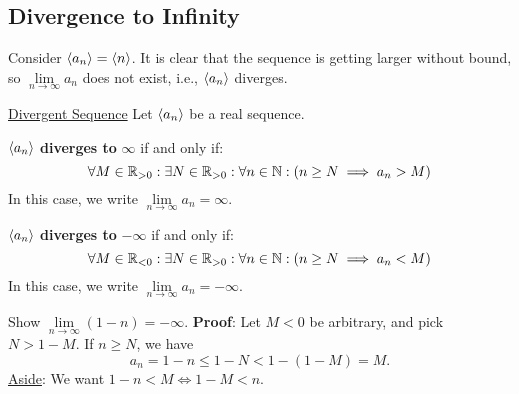 \subsection{Divergence to Infinity}
Consider $ \langle a_n\rangle=\langle n\rangle $. It is clear that the sequence is getting larger without bound, so $ \lim\limits_{{n} \to {\infty}}a_n $
does not exist, i.e., $ \langle a_n\rangle $ diverges.
\begin{Definition}{\href{https://proofwiki.org/wiki/Definition:Unbounded_Divergent_Sequence\#Definition}{Divergent Sequence}}{}
    Let $ \langle a_n\rangle $ be a real sequence.\bigskip

    $ \langle a_n\rangle $ \textbf{diverges to} $ \infty $ if and only if:
    \[ \forall M\in\mathbb{R}_{>0}: \exists N\in \mathbb{R}_{>0}:\forall n\in\mathbb{N}:(n\ge N\implies a_n>M) \]
    In this case, we write $ \lim\limits_{{n} \to {\infty}}a_n=\infty $.\smallskip

    $ \langle a_n\rangle $ \textbf{diverges to} $ -\infty $ if and only if:
    \[ \forall M\in\mathbb{R}_{<0}: \exists N\in \mathbb{R}_{>0}:\forall n\in\mathbb{N}:(n\ge N\implies a_n<M) \]
    In this case, we write $ \lim\limits_{{n} \to {\infty}}a_n=-\infty $.
\end{Definition}
\begin{Example}{}{}
    Show $ \lim\limits_{{n} \to {\infty}}(1-n)=-\infty $.
    \tcblower{}
    \textbf{Proof}: Let $ M<0 $ be arbitrary, and pick $ N>1-M $. If $ n\ge N $, we have
    \[ a_n=1-n\le 1-N<1-(1-M)=M. \]
    \underline{Aside}: We want $ 1-n<M\iff 1-M<n $.
\end{Example}